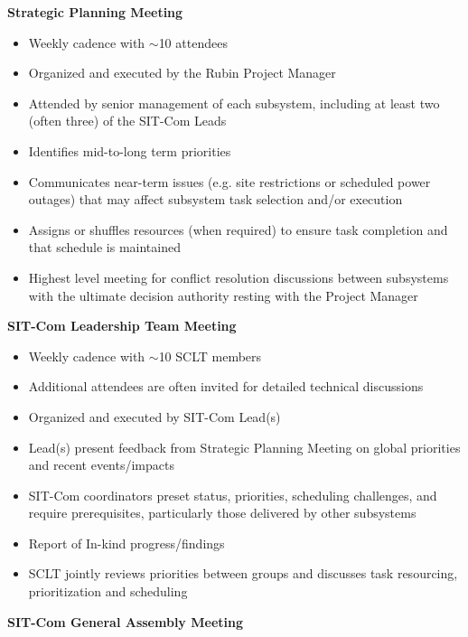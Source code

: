 \documentclass[SE,lsstdraft,authoryear,toc]{lsstdoc}
\begin{document}
\textbf{Strategic Planning Meeting}

\begin{itemize}
    \item Weekly cadence with $\sim$10 attendees
    \item Organized and executed by the Rubin Project Manager
    \item Attended by senior management of each subsystem, including at least two (often three) of the SIT-Com Leads
    \item Identifies mid-to-long term priorities
    \item Communicates near-term issues (e.g. site restrictions or scheduled power outages) that may affect subsystem task selection and/or execution
    \item Assigns or shuffles resources (when required) to ensure task completion and that schedule is maintained
    \item Highest level meeting for conflict resolution discussions between subsystems with the ultimate decision authority resting with the Project Manager \end{itemize}

\textbf{SIT-Com Leadership Team Meeting}

\begin{itemize}
    \item Weekly cadence with $\sim$10 SCLT members
    \item Additional attendees are often invited for detailed technical discussions
    \item Organized and executed by SIT-Com Lead(s)
    \item Lead(s) present feedback from Strategic Planning Meeting on global priorities and recent events/impacts
    \item SIT-Com coordinators preset status, priorities, scheduling challenges, and require prerequisites, particularly those delivered by other subsystems
    \item Report of In-kind progress/findings
    \item SCLT jointly reviews priorities between groups and discusses task resourcing, prioritization and scheduling
\end{itemize}


\textbf{SIT-Com General Assembly Meeting}
\end{document}
